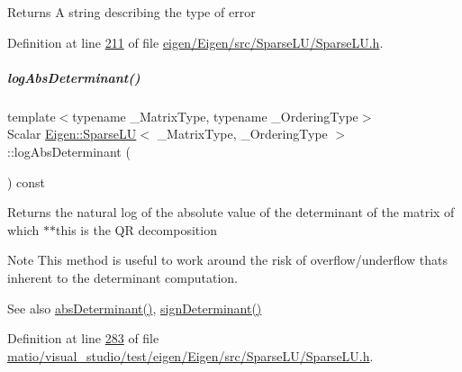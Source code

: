 \begin{DoxyReturn}{Returns}
A string describing the type of error 
\end{DoxyReturn}


Definition at line \hyperlink{eigen_2_eigen_2src_2_sparse_l_u_2_sparse_l_u_8h_source_l00211}{211} of file \hyperlink{eigen_2_eigen_2src_2_sparse_l_u_2_sparse_l_u_8h_source}{eigen/\+Eigen/src/\+Sparse\+L\+U/\+Sparse\+L\+U.\+h}.

\mbox{\label{group___sparse_l_u___module_a89e30a7df205596784a5a73f4768eaec}} 
\subparagraph{\texorpdfstring{log\+Abs\+Determinant()}{logAbsDeterminant()}\hspace{0.1cm}{\footnotesize\ttfamily [1/2]}}
{\footnotesize\ttfamily template$<$typename \+\_\+\+Matrix\+Type, typename \+\_\+\+Ordering\+Type$>$ \\
Scalar \hyperlink{group___sparse_l_u___module_class_eigen_1_1_sparse_l_u}{Eigen\+::\+Sparse\+LU}$<$ \+\_\+\+Matrix\+Type, \+\_\+\+Ordering\+Type $>$\+::log\+Abs\+Determinant (\begin{DoxyParamCaption}{ }\end{DoxyParamCaption}) const\hspace{0.3cm}{\ttfamily [inline]}}

\begin{DoxyReturn}{Returns}
the natural log of the absolute value of the determinant of the matrix of which $\ast$$\ast$this is the QR decomposition
\end{DoxyReturn}
\begin{DoxyNote}{Note}
This method is useful to work around the risk of overflow/underflow that\textquotesingle{}s inherent to the determinant computation.
\end{DoxyNote}
\begin{DoxySeeAlso}{See also}
\hyperlink{group___sparse_l_u___module_a06fa89424239fb169d408f08252426d0}{abs\+Determinant()}, \hyperlink{group___sparse_l_u___module_a6651143e3b18fa90cfb3808b6fd23c4e}{sign\+Determinant()} 
\end{DoxySeeAlso}


Definition at line \hyperlink{matio_2visual__studio_2test_2eigen_2_eigen_2src_2_sparse_l_u_2_sparse_l_u_8h_source_l00283}{283} of file \hyperlink{matio_2visual__studio_2test_2eigen_2_eigen_2src_2_sparse_l_u_2_sparse_l_u_8h_source}{matio/visual\+\_\+studio/test/eigen/\+Eigen/src/\+Sparse\+L\+U/\+Sparse\+L\+U.\+h}.

